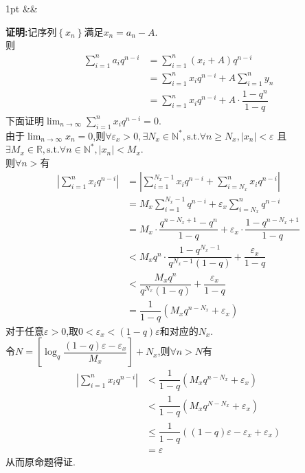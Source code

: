 \documentclass{ctexart}
\newcommand{\R}{\mathbb{R}}
\newcommand{\N}{\mathbb{N}}
\newcommand{\ep}{\varepsilon}
\newcommand{\st}{,\text{s.t.}}
\newenvironment{solution}[1][]{%
\def\FrameCommand{%
\hspace{1pt}%
{\color{solutionline}\vrule width 2pt}%
{\color{solutionshade}\vrule width 4pt}%
\colorbox{solutionshade}%
}%
\MakeFramed{\advance\hsize-\width\FrameRestore}%
\noindent\hspace{-4.55pt}%
\begin{adjustwidth}{}{1pt}%
\setlength{\parindent}{0pt}%
\vspace{3pt}%
\ifx&#1&\else %
    \textbf{#1}\par\vspace{1pt}%
\fi
}
{%
\vspace{2pt}%
\end{adjustwidth}\endMakeFramed%
}
\begin{document}
\begin{solution}
    \textbf{证明:}记序列$\left\{ x_n\right\}$满足$x_n=a_n-A$.\\
    则$$\begin{aligned}
        \sum_{i=1}^{n}{a_iq^{n-i}} 
        &= \sum_{i=1}^{n}{(x_i+A)q^{n-i}} \\
        &= \sum_{i=1}^{n}{x_iq^{n-i}}+A\sum_{i=1}^{n}{y_n} \\
        &= \sum_{i=1}^{n}{x_iq^{n-i}}+A\cdot\dfrac{1-q^n}{1-q}
    \end{aligned}$$
    下面证明$\displaystyle\lim_{n\to\infty}{\sum_{i=1}^{n}{x_iq^{n-i}}}=0$.\\
    由于$\displaystyle\lim_{n\to\infty}{x_n}=0$,则$\forall\ep_x>0,\exists N_x\in\N^*\st\forall n\geqslant N_x,\left|x_n\right|<\ep$
    且$\exists M_x\in\R\st\forall n\in\N^*,\left|x_n\right|<M_x$.\\
    则$\forall n>$有
    \begin{align*}
        \left|\sum_{i=1}^{n}{x_iq^{n-i}}\right|
        &= \left|\sum_{i=1}^{N_x-1}{x_iq^{n-i}}+\sum_{i=N_x}^{n}{x_iq^{n-i}}\right| \\
        &= M_x\sum_{i=1}^{N_x-1}{q^{n-i}}+\ep_x\sum_{i=N_x}^{n}{q^{n-i}} \\
        &= M_x\cdot\dfrac{q^{n-N_x+1}-q^n}{1-q}+\ep_x\cdot\dfrac{1-q^{n-N_x+1}}{1-q} \\
        &< M_xq^n\cdot\dfrac{1-q^{N_x-1}}{q^{N_x-1}(1-q)}+\dfrac{\ep_x}{1-q} \\
        &< \dfrac{M_xq^n}{q^{N_x}(1-q)}+\dfrac{\ep_x}{1-q} \\
        &= \dfrac{1}{1-q}\left(M_xq^{n-N_x}+\ep_x\right)
    \end{align*}
    对于任意$\ep>0$,取$0<\ep_x<(1-q)\ep$和对应的$N_x$.\\
    令$N=\left[\log_q{\dfrac{(1-q)\ep-\ep_x}{M_x}}\right]+N_x$,则$\forall n>N$有
    \begin{align*}
        \left|\sum_{i=1}^{n}{x_iq^{n-i}}\right|
        &< \dfrac{1}{1-q}\left(M_xq^{n-N_x}+\ep_x\right) \\
        &< \dfrac{1}{1-q}\left(M_xq^{N-N_x}+\ep_x\right) \\
        &\leqslant \dfrac{1}{1-q}((1-q)\ep-\ep_x+\ep_x) \\
        &= \ep
    \end{align*}
    从而原命题得证.
\end{solution}
\end{document}
